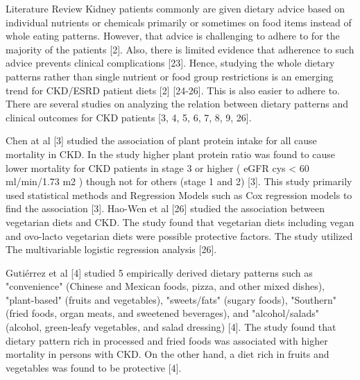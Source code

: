 Literature Review Kidney patients commonly are given dietary advice based on individual nutrients or chemicals primarily or sometimes on food items instead of whole eating patterns. However, that advice is challenging to adhere to for the majority of the patients [2].
Also, there is limited evidence that adherence to such advice prevents clinical complications [23]. Hence, studying the whole dietary patterns rather than single nutrient or food group restrictions is an emerging trend for CKD/ESRD patient diets [2] [24-26]. This is also easier to adhere to. There are several studies on analyzing the relation between dietary patterns and clinical outcomes for CKD patients [3, 4, 5, 6, 7, 8, 9, 26].

Chen at al [3] studied the association of plant protein intake for all cause mortality in CKD. In the study higher plant protein ratio was found to cause lower mortality for CKD patients in stage 3 or higher ( eGFR cys < 60 ml/min/1.73 m2 ) though not for others (stage 1
and 2) [3]. This study primarily used statistical methods and Regression Models such as Cox regression models to find the association [3]. Hao-Wen et al [26] studied the association between vegetarian diets and CKD. The study found that vegetarian diets including vegan and
ovo-lacto vegetarian diets were possible protective factors. The study utilized The multivariable logistic regression analysis [26].

Gutiérrez et al [4] studied 5 empirically derived dietary patterns such as "convenience" (Chinese and Mexican foods, pizza, and other mixed dishes), "plant-based" (fruits and vegetables), "sweets/fats" (sugary foods), "Southern" (fried foods, organ meats, and sweetened
beverages), and "alcohol/salads" (alcohol, green-leafy vegetables, and salad dressing) [4]. The study found that dietary pattern rich in processed and fried foods was associated with higher mortality in persons with CKD. On the other hand, a diet rich in fruits and
vegetables was found to be protective [4].

